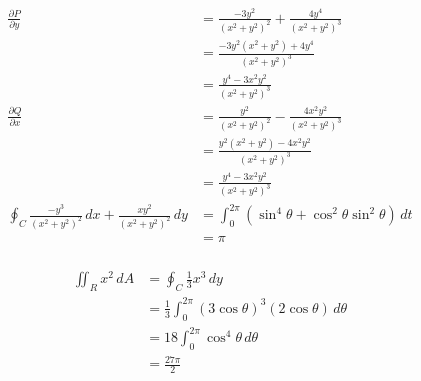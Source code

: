 \documentclass{article}
\begin{document}
\begin{align*}
  \frac{\partial P}{\partial y}                                              & = \frac{-3 y^2}{(x^2 + y^2)^2} + \frac{4 y^4}{(x^2 + y^2)^3}        \\
                                                                             & = \frac{-3 y^2 (x^2 + y^2) + 4 y^4}{(x^2 + y^2)^3}                  \\
                                                                             & = \frac{y^4 - 3 x^2 y^2}{(x^2 + y^2)^3}                             \\
  \frac{\partial Q}{\partial x}                                              & = \frac{y^2}{(x^2 + y^2)^2} - \frac{4 x^2 y^2}{(x^2 + y^2)^3}       \\
                                                                             & = \frac{y^2 (x^2 + y^2) - 4 x^2 y^2}{(x^2 + y^2)^3}                 \\
                                                                             & = \frac{y^4 - 3 x^2 y^2}{(x^2 + y^2)^3}                             \\
  \oint_C \frac{-y^3}{(x^2 + y^2)^2} \,dx + \frac{x y^2}{(x^2 + y^2)^2} \,dy & = \int_0^{2 \pi} (\sin^4 \theta + \cos^2 \theta \sin^2 \theta) \,dt \\
                                                                             & = \pi
\end{align*}

\setcounter{subsubsection}{26}
\subsubsection{}

\begin{align*}
  \iint_R x^2 \,dA & = \oint_C \frac{1}{3} x^3 \,dy                                           \\
                   & = \frac{1}{3} \int_0^{2 \pi} (3 \cos \theta)^3 (2 \cos \theta) \,d\theta \\
                   & = 18 \int_0^{2 \pi} \cos^4 \theta \,d\theta                              \\
                   & = \frac{27 \pi}{2}
\end{align*}

\setcounter{subsubsection}{28}
\subsubsection{}
\end{document}
